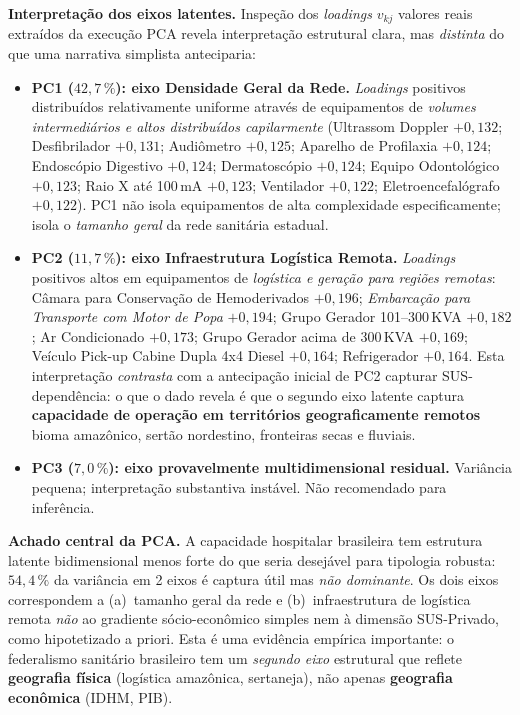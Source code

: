 \documentclass[12pt,a4paper,oneside]{article}
\begin{document}
\textbf{Interpretação dos eixos latentes.} Inspeção dos
\textit{loadings} $v_{kj}$ \textemdash{} valores reais
extraídos da execução PCA \textemdash{} revela interpretação
estrutural clara, mas \textit{distinta} do que uma narrativa
simplista anteciparia:

\begin{itemize}
\item \textbf{PC1 ($42{,}7\,\%$): eixo Densidade Geral da Rede.}
\textit{Loadings} positivos distribuídos relativamente uniforme
através de equipamentos de \textit{volumes intermediários e altos
distribuídos capilarmente} (Ultrassom Doppler $+0{,}132$;
Desfibrilador $+0{,}131$; Audiômetro $+0{,}125$; Aparelho de
Profilaxia $+0{,}124$; Endoscópio Digestivo $+0{,}124$;
Dermatoscópio $+0{,}124$; Equipo Odontológico $+0{,}123$;
Raio X até 100\,mA $+0{,}123$; Ventilador $+0{,}122$;
Eletroencefalógrafo $+0{,}122$). PC1 não isola equipamentos de
alta complexidade especificamente; isola o \textit{tamanho geral}
da rede sanitária estadual.

\item \textbf{PC2 ($11{,}7\,\%$): eixo Infraestrutura
Logística Remota.} \textit{Loadings} positivos altos em
equipamentos de \textit{logística e geração para regiões
remotas}: Câmara para Conservação de Hemoderivados $+0{,}196$;
\textit{Embarcação para Transporte com Motor de Popa}
$+0{,}194$; Grupo Gerador 101--300\,KVA $+0{,}182$; Ar
Condicionado $+0{,}173$; Grupo Gerador acima de 300\,KVA
$+0{,}169$; Veículo Pick-up Cabine Dupla 4x4 Diesel
$+0{,}164$; Refrigerador $+0{,}164$. Esta interpretação
\textit{contrasta} com a antecipação inicial de PC2 capturar
SUS-dependência: o que o dado revela é que o segundo eixo
latente captura \textbf{capacidade de operação em territórios
geograficamente remotos} \textemdash{} bioma amazônico, sertão
nordestino, fronteiras secas e fluviais.

\item \textbf{PC3 ($7{,}0\,\%$): eixo provavelmente
multidimensional residual.} Variância pequena; interpretação
substantiva instável. Não recomendado para inferência.
\end{itemize}

\textbf{Achado central da PCA.} A capacidade hospitalar
brasileira tem estrutura latente bidimensional menos forte do que
seria desejável para tipologia robusta: $54{,}4\,\%$ da variância
em 2 eixos é captura útil mas \textit{não dominante}. Os dois
eixos correspondem a (a)~tamanho geral da rede e (b)~infraestrutura
de logística remota \textemdash{} \textit{não} ao gradiente
sócio-econômico simples nem à dimensão SUS-Privado, como
hipotetizado a priori. Esta é uma evidência empírica importante:
o federalismo sanitário brasileiro tem um \textit{segundo eixo}
estrutural que reflete \textbf{geografia física} (logística
amazônica, sertaneja), não apenas \textbf{geografia econômica}
(IDHM, PIB).
\end{document}

